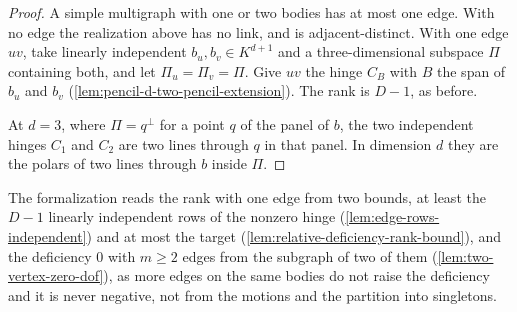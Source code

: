 \begin{proof}
  A simple multigraph with one or two bodies has at most one edge. With
  no edge the realization above has no link, and is adjacent-distinct.
  With one edge $uv$, take linearly independent $b_u, b_v \in K^{d+1}$
  and a three-dimensional subspace $\Pi$ containing both, and let
  $\Pi_u = \Pi_v = \Pi$. Give $uv$ the hinge $C_B$ with $B$ the span of
  $b_u$ and $b_v$ (\cref{lem:pencil-d-two-pencil-extension}). The rank
  is $D - 1$, as before.

  At $d = 3$, where $\Pi = q^{\perp}$ for a point $q$ of the panel of $b$,
  the two independent hinges $C_1$ and $C_2$ are two lines through $q$ in
  that panel. In dimension $d$ they are the polars of two lines through
  $b$ inside $\Pi$.
\end{proof}

\begin{fmlnote}
  The formalization reads the rank with one edge from two bounds, at
  least the $D - 1$ linearly independent rows of the nonzero hinge
  (\cref{lem:edge-rows-independent}) and at most the target
  (\cref{lem:relative-deficiency-rank-bound}), and the deficiency $0$
  with $m \ge 2$ edges from the subgraph of two of them
  (\cref{lem:two-vertex-zero-dof}), as more edges on the same bodies do
  not raise the deficiency and it is never negative, not from the
  motions and the partition into singletons.
\end{fmlnote}

